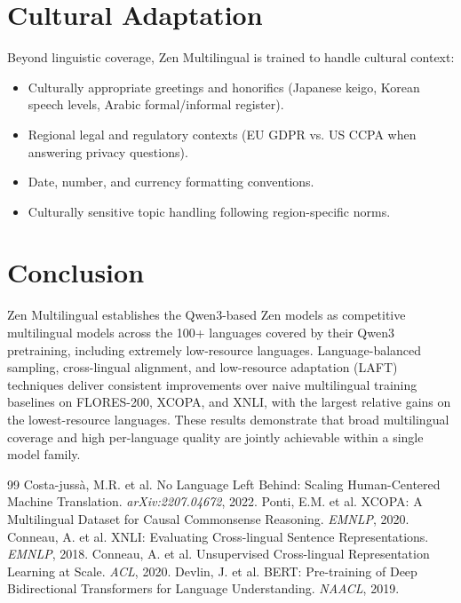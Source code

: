 \documentclass[11pt,a4paper]{article}
\begin{document}
\section{Cultural Adaptation}

Beyond linguistic coverage, Zen Multilingual is trained to handle cultural context:

\begin{itemize}
  \item Culturally appropriate greetings and honorifics (Japanese keigo, Korean speech levels, Arabic formal/informal register).
  \item Regional legal and regulatory contexts (EU GDPR vs. US CCPA when answering privacy questions).
  \item Date, number, and currency formatting conventions.
  \item Culturally sensitive topic handling following region-specific norms.
\end{itemize}

\section{Conclusion}

Zen Multilingual establishes the Qwen3-based Zen models as competitive multilingual models across the 100+ languages covered by their Qwen3 pretraining, including extremely low-resource languages. Language-balanced sampling, cross-lingual alignment, and low-resource adaptation (LAFT) techniques deliver consistent improvements over naive multilingual training baselines on FLORES-200, XCOPA, and XNLI, with the largest relative gains on the lowest-resource languages. These results demonstrate that broad multilingual coverage and high per-language quality are jointly achievable within a single model family.

\begin{thebibliography}{99}
 Costa-juss{\`a}, M.R. et al. No Language Left Behind: Scaling Human-Centered Machine Translation. \textit{arXiv:2207.04672}, 2022.
 Ponti, E.M. et al. XCOPA: A Multilingual Dataset for Causal Commonsense Reasoning. \textit{EMNLP}, 2020.
 Conneau, A. et al. XNLI: Evaluating Cross-lingual Sentence Representations. \textit{EMNLP}, 2018.
 Conneau, A. et al. Unsupervised Cross-lingual Representation Learning at Scale. \textit{ACL}, 2020.
 Devlin, J. et al. BERT: Pre-training of Deep Bidirectional Transformers for Language Understanding. \textit{NAACL}, 2019.
\end{thebibliography}
\end{document}
